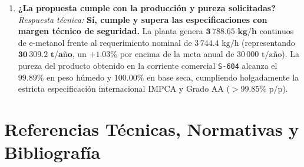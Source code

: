 \documentclass[10pt,letterpaper]{article}
\begin{document}
\begin{enumerate}[leftmargin=*,itemsep=7pt]
    \item \textbf{¿La propuesta cumple con la producción y pureza solicitadas?}\\
    \textit{Respuesta técnica:} \textbf{Sí, cumple y supera las especificaciones con margen técnico de seguridad.} La planta genera $\mathbf{3\,788.65\text{ kg/h}}$ continuos de e-metanol frente al requerimiento nominal de $3\,744.4\text{ kg/h}$ (representando $\mathbf{30\,309.2\text{ t/año}}$, un $+1.03\%$ por encima de la meta anual de $30\,000\text{ t/año}$). La pureza del producto obtenido en la corriente comercial \texttt{S-604} alcanza el $\mathbf{99.89\%}$ en peso húmedo y $\mathbf{100.00\%}$ en base seca, cumpliendo holgadamente la estricta especificación internacional IMPCA y Grado AA ($>99.85\%$ p/p).
\end{enumerate}

\newpage
\section{Referencias Técnicas, Normativas y Bibliografía}
\end{document}
